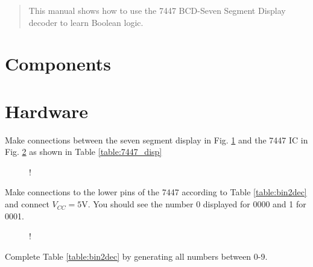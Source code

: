 \documentclass[journal,12pt,twocolumn]{IEEEtran}
\begin{document}
\tableofcontents

\bigskip
%
\begin{abstract}
This manual shows how to use the 7447 BCD-Seven Segment Display decoder to learn Boolean logic.
\end{abstract}
\section{Components}
\begin{table}[!h]
\centering

\caption{}
\label{table:components}
\end{table}
\section{Hardware}
\begin{problem}
Make connections between the seven segment display in Fig. \ref{fig:sevenseg} and the  7447 IC in Fig. \ref{fig:7447} as shown in Table \ref{table:7447_disp}
\end{problem}
%
\begin{table}[!h]
\centering

\caption{}
\label{table:7447_disp}
\end{table}
\begin{figure}[!h]
\begin{center}
 {!} {

}
\end{center}
\caption{}
\label{fig:sevenseg}
\end{figure}
\begin{problem}
Make connections to the lower pins of the 7447 according to
Table \ref{table:bin2dec} and connect $V_{CC} = 5$V. You should see the number 0 displayed for 0000 and 1 for 0001.
\end{problem}
%
\begin{table}[!h]
\centering

\caption{}
\label{table:bin2dec}
\end{table}
%
\begin{figure}[!h]
\begin{center}
\resizebox {\columnwidth} {!} {

}
\end{center}
\caption{}
\label{fig:7447}
\end{figure}
%
\begin{problem}
Complete Table \ref{table:bin2dec} by generating all numbers between 0-9.
\end{problem}
\end{document}
